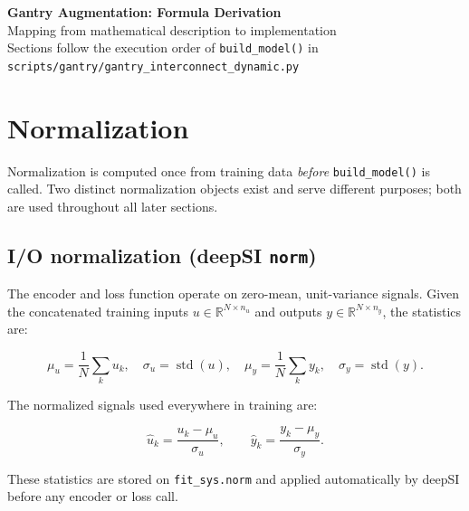 \documentclass[11pt,a4paper]{article}
\newcommand{\file}[1]{\texttt{\small #1}}
\newcommand{\code}[1]{\texttt{#1}}
\begin{document}
\begin{center}
  {\LARGE\bfseries Gantry Augmentation: Formula Derivation}\\[6pt]
  {\large Mapping from mathematical description to implementation}\\[4pt]
  {\small Sections follow the execution order of \file{build\_model()} in
  \file{scripts/gantry/gantry\_interconnect\_dynamic.py}}
\end{center}

\tableofcontents
\newpage

\section{Normalization}
\label{sec:norm}

Normalization is computed once from training data \emph{before}
\code{build\_model()} is called.
Two distinct normalization objects exist and serve different purposes;
both are used throughout all later sections.

\subsection{I/O normalization (deepSI \texttt{norm})}

The encoder and loss function operate on zero-mean, unit-variance signals.
Given the concatenated training inputs $u \in \mathbb{R}^{N \times n_u}$
and outputs $y \in \mathbb{R}^{N \times n_y}$, the statistics are:

\begin{equation}
  \mu_u = \frac{1}{N}\sum_k u_k, \quad
  \sigma_u = \operatorname{std}(u), \quad
  \mu_y = \frac{1}{N}\sum_k y_k, \quad
  \sigma_y = \operatorname{std}(y).
  \label{eq:io_stats}
\end{equation}

The normalized signals used everywhere in training are:

\begin{equation}
  \hat{u}_k = \frac{u_k - \mu_u}{\sigma_u}, \qquad
  \hat{y}_k = \frac{y_k - \mu_y}{\sigma_y}.
  \label{eq:io_norm}
\end{equation}

These statistics are stored on \code{fit\_sys.norm} and applied automatically
by deepSI before any encoder or loss call.
\end{document}
